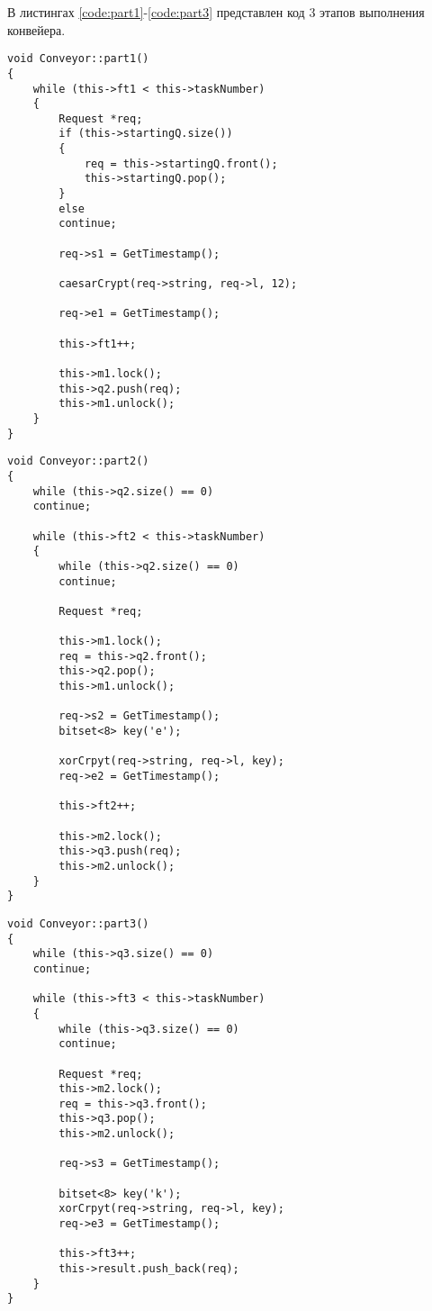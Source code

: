 \par В листингах \ref{code:part1}-\ref{code:part3} представлен код 3 этапов выполнения конвейера.
\begin{lstlisting}[caption= Первый этап выполнения конвейера, label=code:part1]
void Conveyor::part1()
{
	while (this->ft1 < this->taskNumber)
	{
		Request *req;
		if (this->startingQ.size())
		{
			req = this->startingQ.front();
			this->startingQ.pop();
		}
		else
		continue;
		
		req->s1 = GetTimestamp();
		
		caesarCrypt(req->string, req->l, 12);
		
		req->e1 = GetTimestamp();
		
		this->ft1++;
		
		this->m1.lock();
		this->q2.push(req);
		this->m1.unlock();
	}
}
\end{lstlisting}
\begin{lstlisting}[caption= Второй этап выполнения конвейера, label=code:part2]
void Conveyor::part2()
{
	while (this->q2.size() == 0)
	continue;
	
	while (this->ft2 < this->taskNumber)
	{
		while (this->q2.size() == 0)
		continue;
		
		Request *req;
		
		this->m1.lock();
		req = this->q2.front();
		this->q2.pop();
		this->m1.unlock();
		
		req->s2 = GetTimestamp();
		bitset<8> key('e');
		
		xorCrpyt(req->string, req->l, key);
		req->e2 = GetTimestamp();
		
		this->ft2++;
		
		this->m2.lock();
		this->q3.push(req);
		this->m2.unlock();
	}
}
\end{lstlisting}
\begin{lstlisting}[caption= Третий этап выполнения конвейера, label=code:part3]
void Conveyor::part3()
{
	while (this->q3.size() == 0)
	continue;
	
	while (this->ft3 < this->taskNumber)
	{
		while (this->q3.size() == 0)
		continue;
		
		Request *req;
		this->m2.lock();
		req = this->q3.front();
		this->q3.pop();
		this->m2.unlock();
		
		req->s3 = GetTimestamp();
		
		bitset<8> key('k');
		xorCrpyt(req->string, req->l, key);
		req->e3 = GetTimestamp();
		
		this->ft3++;
		this->result.push_back(req);
	}
}	
\end{lstlisting}
